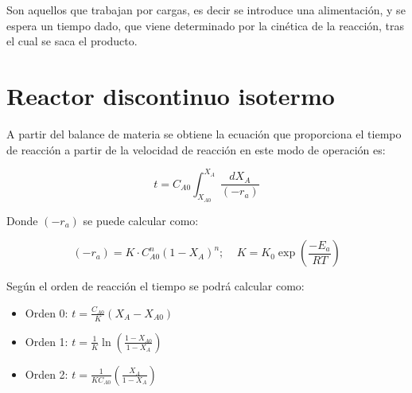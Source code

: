 	Son aquellos que trabajan por cargas, es decir se introduce una alimentación, y se espera un tiempo dado, que viene determinado por la cinética de la reacción, tras el cual se saca el producto.
	
	\section{Reactor discontinuo isotermo}
	A partir del balance de materia se obtiene la ecuación que proporciona el tiempo de reacción a partir de la velocidad de reacción en este modo de operación es:
	
	\begin{equation*}
	t = C_{A0}\int_{X_{A0}}^{X_A}\frac{dX_A}{(-r_a)}
	\end{equation*}
	
	Donde $(-r_a)$ se puede calcular como:
	
	\begin{equation*}
	(-r_a) = K \cdot C_{A0}^n (1-X_A)^n; ~~~~~ K = K_0\exp\left(\frac{-E_a}{RT}\right)
	\end{equation*}
	
	Según el orden de reacción el tiempo se podrá calcular como:
	
	\begin{itemize}
		\item Orden 0: $ t = \frac{C_{A0}}{K}(X_A-X_{A0})$
		\item Orden 1: $ t = \frac{1}{K}\ln\left(\frac{1-X_{A0}}{1-X_A}\right)$
		\item Orden 2: $ t = \frac{1}{KC_{A0}}\left(\frac{X_A}{1- X_A}\right)$
	\end{itemize}
	
